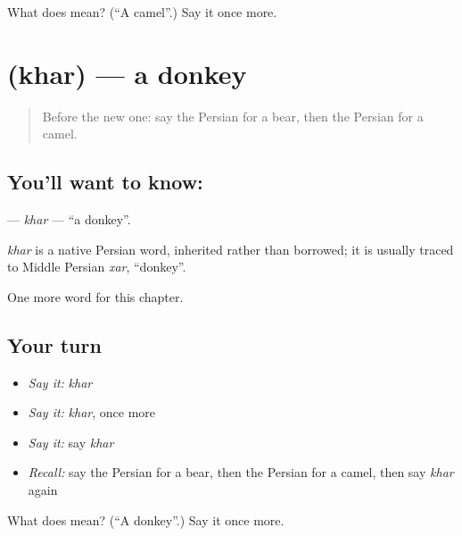 \begin{tcolorbox}[breakable,colback=teal!4,colframe=teal!35!black,title={Before you move on}]
What does  mean? (\textquotedblleft{}A camel\textquotedblright{}.) Say it once more.
\end{tcolorbox}
\section[\texorpdfstring{\fa{خر} (khar)}{خر (khar)}]{ (khar) — a donkey}

\label{lesson:FA-C57-khar}



\begin{quote}
Before the new one: say the Persian for a bear, then the Persian for a camel.
\end{quote}

\subsection*{You'll want to know: }
\textbf{} — \emph{khar} — \textquotedblleft{}a donkey\textquotedblright{}.

\begin{cousinweb}
\emph{khar} is a native Persian word, inherited rather than borrowed; it is usually traced to Middle Persian \emph{xar}, \textquotedblleft{}donkey\textquotedblright{}.
\end{cousinweb}

\begin{grammarlens}[title={What you've built}]
One more word for this chapter.
\end{grammarlens}

\subsection*{Your turn}
\begin{itemize}
\raggedright
  \item \emph{Say it:} \emph{khar}
  \item \emph{Say it:} \emph{khar}, once more
  \item \emph{Say it:} say \emph{khar}
  \item \emph{Recall:} say the Persian for a bear, then the Persian for a camel, then say \emph{khar} again
\end{itemize}

\begin{tcolorbox}[breakable,colback=teal!4,colframe=teal!35!black,title={Before you move on}]
What does  mean? (\textquotedblleft{}A donkey\textquotedblright{}.) Say it once more.
\end{tcolorbox}
